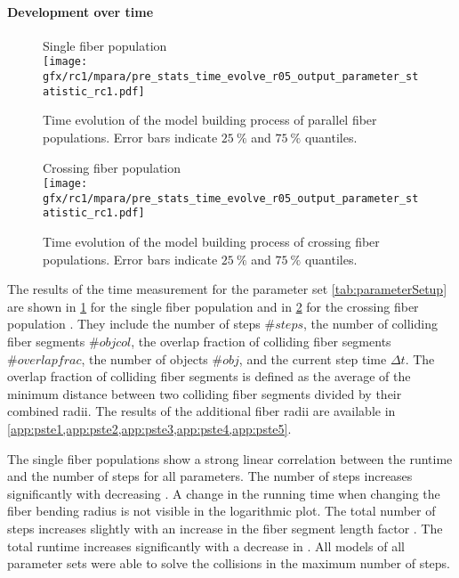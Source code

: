 \paragraph{Development over time}
%
\begin{figure}[p]
\centering
Single fiber population \pfbs{}\\[0em]
\texttt{[image: gfx/rc1/mpara/pre\_stats\_time\_evolve\_r05\_output\_parameter\_statistic\_rc1.pdf]}
\caption{Time evolution of the model building process of parallel fiber populations. Error bars indicate $\SI{25}{\percent}$ and $\SI{75}{\percent}$ quantiles.}
\label{fig:timeDevelopmentNone}
\end{figure}
%
\begin{figure}[p]
\centering
Crossing fiber population \cfbs{}\\[0ex]
\texttt{[image: gfx/rc1/mpara/pre\_stats\_time\_evolve\_r05\_output\_parameter\_statistic\_rc1.pdf]}
\caption{Time evolution of the model building process of crossing fiber populations. Error bars indicate $\SI{25}{\percent}$ and $\SI{75}{\percent}$ quantiles.}
\label{fig:timeDevelopmentCross}
\end{figure}
%
The results of the time measurement for the parameter set \cref{tab:parameterSetup} are shown in \cref{fig:timeDevelopmentNone} for the single fiber population \pfbs{} and in \cref{fig:timeDevelopmentCross} for the crossing fiber population \cfbs{}.
They include the number of steps $\# steps$, the number of colliding fiber segments $\# objcol$, the overlap fraction of colliding fiber segments $\# overlapfrac$, the number of objects $\# obj$, and the current step time $\Delta t$.
The overlap fraction of colliding fiber segments is defined as the average of the minimum distance between two colliding fiber segments divided by their combined radii.
The results of the additional fiber radii are available in \cref{app:pste1,app:pste2,app:pste3,app:pste4,app:pste5}.
\par
%
The single fiber populations \pfbs{} show a strong linear correlation between the runtime and the number of steps for all parameters.
The number of steps increases significantly with decreasing \segLengthFactor{}.
A change in the running time when changing the fiber bending radius \segRadiusFactor{} is not visible in the logarithmic plot.
The total number of steps increases slightly with an increase in the fiber segment length factor \segLengthFactor{}.
The total runtime increases significantly with a decrease in \segLengthFactor{}.
All models of all parameter sets were able to solve the collisions in the maximum number of steps.
